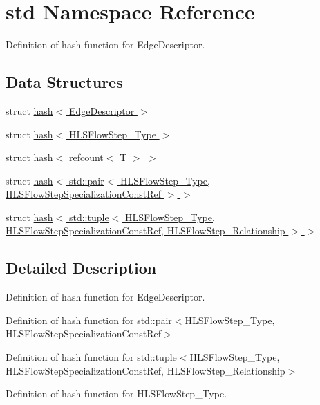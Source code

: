 \hypertarget{namespacestd}{}\section{std Namespace Reference}
\label{namespacestd}


Definition of hash function for Edge\+Descriptor.  


\subsection*{Data Structures}
\begin{DoxyCompactItemize}
\item 
struct \hyperlink{structstd_1_1hash_3_01EdgeDescriptor_01_4}{hash$<$ Edge\+Descriptor $>$}
\item 
struct \hyperlink{structstd_1_1hash_3_01HLSFlowStep__Type_01_4}{hash$<$ H\+L\+S\+Flow\+Step\+\_\+\+Type $>$}
\item 
struct \hyperlink{structstd_1_1hash_3_01refcount_3_01T_01_4_01_4}{hash$<$ refcount$<$ T $>$ $>$}
\item 
struct \hyperlink{structstd_1_1hash_3_01std_1_1pair_3_01HLSFlowStep__Type_00_01HLSFlowStepSpecializationConstRef_01_4_01_4}{hash$<$ std\+::pair$<$ H\+L\+S\+Flow\+Step\+\_\+\+Type, H\+L\+S\+Flow\+Step\+Specialization\+Const\+Ref $>$ $>$}
\item 
struct \hyperlink{structstd_1_1hash_3_01std_1_1tuple_3_01HLSFlowStep__Type_00_01HLSFlowStepSpecializationConstRef_bc8b707a477881811f135e704822f95e}{hash$<$ std\+::tuple$<$ H\+L\+S\+Flow\+Step\+\_\+\+Type, H\+L\+S\+Flow\+Step\+Specialization\+Const\+Ref, H\+L\+S\+Flow\+Step\+\_\+\+Relationship $>$ $>$}
\end{DoxyCompactItemize}


\subsection{Detailed Description}
Definition of hash function for Edge\+Descriptor. 

Definition of hash function for std\+::pair$<$\+H\+L\+S\+Flow\+Step\+\_\+\+Type, H\+L\+S\+Flow\+Step\+Specialization\+Const\+Ref$>$

Definition of hash function for std\+::tuple$<$\+H\+L\+S\+Flow\+Step\+\_\+\+Type, H\+L\+S\+Flow\+Step\+Specialization\+Const\+Ref, H\+L\+S\+Flow\+Step\+\_\+\+Relationship$>$

Definition of hash function for H\+L\+S\+Flow\+Step\+\_\+\+Type. 